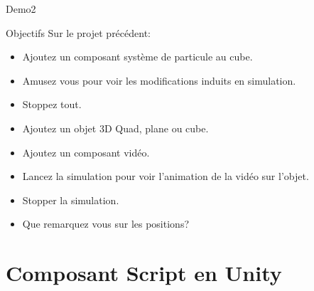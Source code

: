 \begin{frame}{Demo2}
		\vfill
	\begin{block}{Objectifs}
		Sur le projet précédent:
		\begin{itemize}
			\item Ajoutez un composant système de particule au cube.
			\item Amusez vous pour voir les modifications induits en simulation.
			\item Stoppez tout.
			\item Ajoutez un objet 3D Quad, plane ou cube.
			\item Ajoutez un composant vidéo.
			\item Lancez la simulation pour voir l'animation de la vidéo sur l'objet.
			\item Stopper la simulation.
			\item Que remarquez vous sur les positions?
		\end{itemize}
	\end{block}
	\vfill
\end{frame}

\section{Composant Script en Unity}

